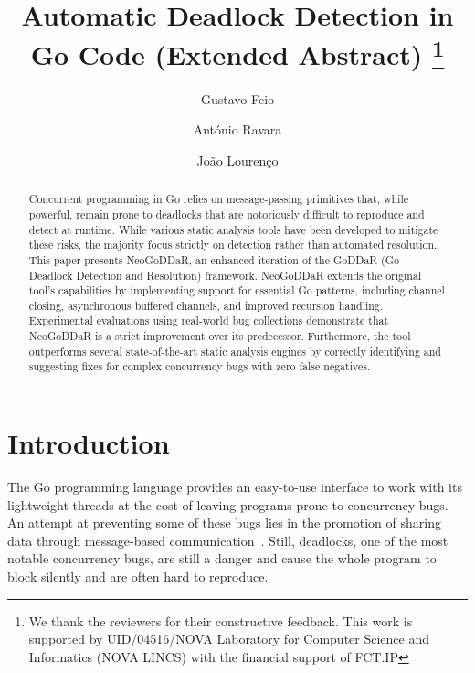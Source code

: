 \documentclass[runningheads]{llncs}
\begin{document}
%
\title{Automatic Deadlock Detection in Go Code (Extended Abstract)%
\thanks{We thank the reviewers for their constructive feedback. This work is supported by UID/04516/NOVA Laboratory for Computer Science and Informatics (NOVA LINCS) with the financial support of FCT.IP}}
%
%
\author{Gustavo Feio \and
António Ravara \and
João Lourenço}
%
%
%
\maketitle              %

\begin{abstract}
Concurrent programming in Go relies on message-passing primitives that, while powerful, remain prone to deadlocks that are notoriously difficult to reproduce and detect at runtime. 
While various static analysis tools have been developed to mitigate these risks, the majority focus strictly on detection rather than automated resolution. 
This paper presents NeoGoDDaR, an enhanced iteration of the GoDDaR (Go Deadlock Detection and Resolution) framework. 
NeoGoDDaR extends the original tool’s capabilities by implementing support for essential Go patterns, including channel closing, asynchronous buffered channels, and improved recursion handling. 
Experimental evaluations using real-world bug collections demonstrate that NeoGoDDaR is a strict improvement over its predecessor. 
Furthermore, the tool outperforms several state-of-the-art static analysis engines by correctly identifying and suggesting fixes for complex concurrency bugs with zero false negatives.

\end{abstract}

\section{Introduction}
The Go programming language provides an easy-to-use interface to work with its lightweight threads at the cost of leaving programs prone to concurrency bugs. An attempt at preventing some of these bugs lies in the promotion of sharing data through message-based communication~\cite{GoProverb,EffectiveGo}. Still, deadlocks, one of the most notable concurrency bugs, are still a danger and cause the whole program to block silently and are often hard to reproduce.
\end{document}
